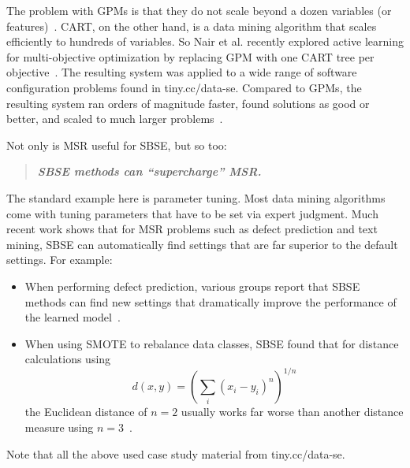 \documentclass[sigconf,anonymous,review]{acmart}
\begin{document}
The problem with GPMs is that they do not scale beyond a dozen variables (or features)~\cite{wang2016bayesian}. CART, on the other hand, is a data mining algorithm that scales efficiently
to hundreds of variables. So Nair et al. recently explored  
 active learning  for multi-objective optimization by replacing GPM with one CART tree per objective~\cite{nair2018finding}.
 The resulting system was applied to a wide range of software configuration problems
 found in tiny.cc/data-se.
 Compared to GPMs, the resulting system ran orders of magnitude faster, found solutions
 as good or better, and  scaled to much larger problems~\cite{nair2018finding}. 

Not only is   MSR useful for   SBSE, but so too:
\begin{quote}
\centering
{\bf {\em SBSE methods can    ``supercharge''    MSR.}}
\end{quote}
The standard example here is parameter tuning. Most data mining algorithms come with tuning
parameters that have to be set via expert judgment. Much recent work shows that for
MSR problems such as defect prediction and text mining, SBSE can automatically find settings that are far superior to the default settings. For example:
\begin{itemize}[leftmargin=*]
 \item
   When performing defect prediction, various groups report that SBSE methods can find new settings that dramatically improve the performance of the learned model~\cite{fu2016tuning,tantithamthavorn2016automated, Tantithamthavorn2018}.

\item When using SMOTE to rebalance data classes, SBSE found that for 
distance calculations using 
  \[d(x,y)=\left(\sum_i(x_i-y_i)^n\right)^{1/n}\] the Euclidean distance of $n=2$ usually works far worse than another distance measure using $n=3$~\cite{agrawal2017better}.
 
\end{itemize} 
Note that all the above used case study material from tiny.cc/data-se.
\end{document}
